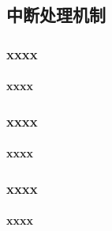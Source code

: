\subsection{中断处理机制}

\begin{frame}
	\frametitle{xxxx}
	\framesubtitle{xxxx}
\end{frame}
% 
% 
% 
% 
\begin{frame}
	\frametitle{xxxx}
	\framesubtitle{xxxx}
\end{frame}
% 
% 
% 
\begin{frame}
	\frametitle{xxxx}
	\framesubtitle{xxxx}
\end{frame}


